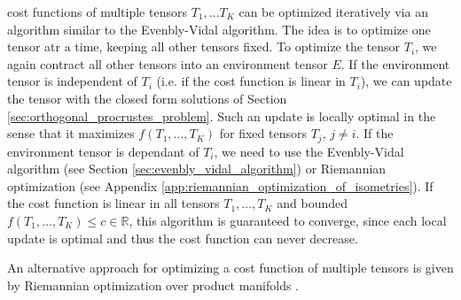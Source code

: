 cost functions of multiple tensors $T_1, \dots T_K$ can be optimized iteratively via an algorithm similar to the Evenbly-Vidal algorithm. The idea is to optimize one tensor atr a time, keeping all other tensors fixed. To optimize the tensor $T_i$, we again contract all other tensors into an environment tensor $E$. If the environment tensor is independent of $T_i$ (i.e. if the cost function is linear in $T_i$), we can update the tensor with the closed form solutions of Section \ref{sec:orthogonal_procrustes_problem}. Such an update is locally optimal in the sense that it maximizes $f(T_1, \dots, T_K)$ for fixed tensors $T_j$, $j\neq i$. If the environment tensor is dependant of $T_i$, we need to use the Evenbly-Vidal algorithm (see Section \ref{sec:evenbly_vidal_algorithm}) or Riemannian optimization (see Appendix \ref{app:riemannian_optimization_of_isometries}). If the cost function is linear in all tensors $T_1, \dots, T_K$ and bounded $f(T_1, \dots, T_K) \le c\in\mathbb{R}$, this algorithm is guaranteed to converge, since each local update is optimal and thus the cost function can never decrease. \par
An alternative approach for optimizing a cost function of multiple tensors is given by Riemannian optimization over product manifolds \cite{cite:riemannian_optimization_isometric_tensor_networks}.